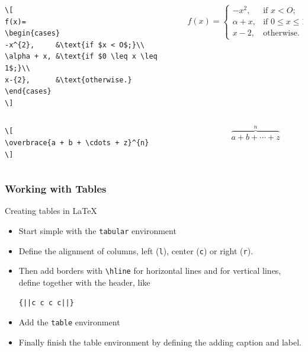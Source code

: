 \documentclass[aspectratio=169]{beamer}
\begin{document}
\begin{frame}[fragile]
%
%
\begin{columns}
    \tiny
    \begin{column}{0.5\textwidth}
        \begin{verbatim}
\[
f(x)=
\begin{cases}
-x^{2},     &\text{if $x < O$;}\\
\alpha + x, &\text{if $0 \leq x \leq 1$;}\\
x-{2},      &\text{otherwise.}
\end{cases}    
\]
        \end{verbatim}
    \end{column}
    \begin{column}{0.5\textwidth}    
\[
f(x)=
\begin{cases}
-x^{2},     &\text{if $x < O$;}\\
\alpha + x, &\text{if $0 \leq x \leq 1$;}\\
x-{2},      &\text{otherwise.}
\end{cases}    
\]
    \end{column}
    \normalsize
\end{columns}

%
%
\begin{columns}
    \tiny
    \begin{column}{0.5\textwidth}
        \begin{verbatim}
\[
\overbrace{a + b + \cdots + z}^{n}
\]
        \end{verbatim}
    \end{column}
    \begin{column}{0.5\textwidth}
\[
\overbrace{a + b + \cdots + z}^{n}
\]
    \end{column}
    \normalsize
\end{columns}

  
\end{frame}

\begin{frame}[fragile]
\frametitle{Working with Tables}
    Creating tables in \LaTeX
    \begin{itemize}
        \item Start simple with the \texttt{tabular} environment
        \item Define the alignment of columns, left (\texttt{l}), center (\texttt{c}) or right (\texttt{r}).
        \item Then add borders with \verb|\hline| for horizontal lines and for vertical lines, define together with the header, like 
\begin{verbatim}
{||c c c c||}    
\end{verbatim}
        \item Add the \texttt{table} environment 
        \item Finally finish the table environment by defining the adding caption and label.
    \end{itemize}
\end{frame}
\end{document}
